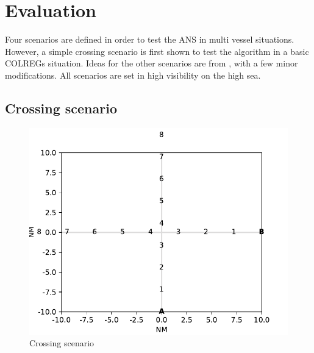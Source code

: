 \chapter{Evaluation}%
\label{sec:overtaking-and-head-on}
Four scenarios are defined in order to test the ANS in multi vessel situations. However, a simple crossing scenario is first shown to test the algorithm in a basic COLREGs situation. Ideas for the other scenarios are from \textcite{ecolreg_overtaking-and-crossing-2,ecolreg_overtaking-and-crossing-3,ecolreg_overtaking-and-crossing,ecolreg_overtaking-and-head-on}, with a few minor modifications. All scenarios are set in high visibility on the high sea.

\section{Crossing scenario}%

\begin{figure}[h]
    \centering
    \includegraphics[width=\textwidth,height=0.75\textheight,keepaspectratio]{Figures/Scenario/simple-scen.pdf}
    \caption{Crossing scenario}
    \label{fig:simple-scen}
\end{figure}


